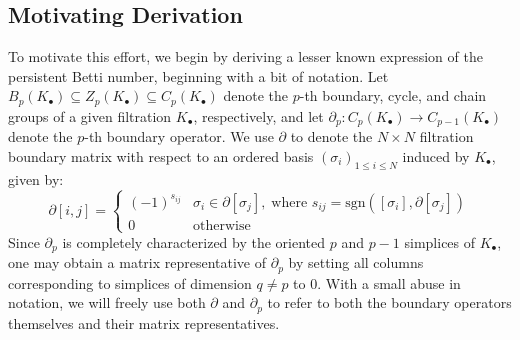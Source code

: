 \documentclass[10pt]{article}
\numberwithin{equation}{section}
\newcommand{\+}{%
	\raisebox{0.18ex}{\scaleobj{0.55}{+}}
}
\theoremstyle{definition}
\theoremstyle{definition}
\begin{document}
\subsection{Motivating Derivation}\label{sec:betti_derivation}
To motivate this effort, we begin by deriving a lesser known
expression of the persistent Betti number, beginning with a bit of notation. 
Let $B_p(K_\bullet) \subseteq Z_p(K_\bullet) \subseteq C_p(K_\bullet)$ denote the $p$-th boundary, cycle, and chain groups of a given filtration $K_\bullet$, respectively, and let $\partial_p : C_p( K_{\bullet}) \to C_{p-1}(K_{\bullet})$ denote the $p$-th boundary operator. 
We use $\partial$ to denote the $N \times N$ filtration boundary matrix with respect to an ordered basis $(\sigma_i)_{1 \leq i \leq N}$ induced by $K_\bullet$, given by:
\begin{equation}\label{eq:boundary_matrix}
	\partial[i,j] = \begin{cases}
		(-1)^{s_{ij}} & \sigma_i \in \partial[\sigma_j], \; \text{where } s_{ij} = \mathrm{sgn}([\sigma_i], \partial [\sigma_j])  \\
		0 & \text{otherwise}
	\end{cases}
\end{equation}
Since $\partial_p$ is completely characterized by the oriented $p$ and $p-1$ simplices of $K_\bullet$,  one may obtain a matrix representative of $\partial_p$ by setting all columns corresponding to simplices of dimension $q \neq p$ to $0$. 
With a small abuse in notation, we will freely use both $\partial$ and $\partial_p$ to refer to both the boundary operators themselves and their matrix representatives.
\end{document}
